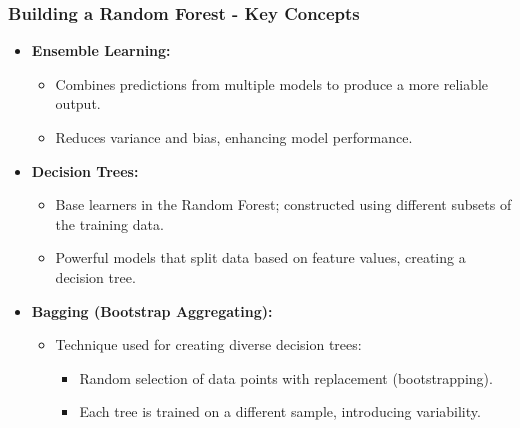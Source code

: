 \documentclass[aspectratio=169]{beamer}
\begin{document}
\begin{frame}[fragile]
    \frametitle{Building a Random Forest - Key Concepts}
    \begin{itemize}
        \item \textbf{Ensemble Learning:}
        \begin{itemize}
            \item Combines predictions from multiple models to produce a more reliable output.
            \item Reduces variance and bias, enhancing model performance.
        \end{itemize}

        \item \textbf{Decision Trees:}
        \begin{itemize}
            \item Base learners in the Random Forest; constructed using different subsets of the training data.
            \item Powerful models that split data based on feature values, creating a decision tree.
        \end{itemize}

        \item \textbf{Bagging (Bootstrap Aggregating):}
        \begin{itemize}
            \item Technique used for creating diverse decision trees:
            \begin{itemize}
                \item Random selection of data points with replacement (bootstrapping).
                \item Each tree is trained on a different sample, introducing variability.
            \end{itemize}
        \end{itemize}
    \end{itemize}
\end{frame}
\end{document}
